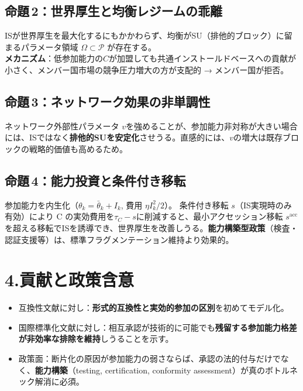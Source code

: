 \documentclass[a4paper,10pt]{article}
\begin{document}
\subsection*{命題\,2：世界厚生と均衡レジームの乖離}
ISが世界厚生を最大化するにもかかわらず、均衡がSU（排他的ブロック）に留まるパラメータ領域 $\Omega \subset \mathcal{P}$ が存在する。\\
\textbf{メカニズム}：低参加能力の$C$が加盟しても共通インストールドベースへの貢献が小さく、メンバー国市場の競争圧力増大の方が支配的 → メンバー国が拒否。

\subsection*{命題\,3：ネットワーク効果の非単調性}
ネットワーク外部性パラメータ $v$を強めることが、参加能力非対称が大きい場合には、ISではなく\textbf{排他的SUを安定化}させうる。直感的には、$v$の増大は既存ブロックの戦略的価値も高めるため。

\subsection*{命題\,4：能力投資と条件付き移転}
参加能力を内生化（$\theta_k = \bar\theta_k + I_k$, 費用 $\eta I_k^2/2$）。
条件付き移転 $s$（IS実現時のみ有効）により C の実効費用を$\tau_C - s$に削減すると、最小アクセッション移転 $s^{\mathrm{acc}}$ を超える移転でISを誘導でき、世界厚生を改善しうる。\textbf{能力構築型政策}（検査・認証支援等）は、標準フラグメンテーション維持より効果的。

\section*{4.\;貢献と政策含意}
\begin{itemize}[leftmargin=1.2em, itemsep=1pt, topsep=0pt]
  \item 互換性文献に対し：\textbf{形式的互換性と実効的参加の区別}を初めてモデル化。
  \item 国際標準化文献に対し：相互承認が技術的に可能でも\textbf{残留する参加能力格差が非効率な排除を維持}しうることを示す。
  \item 政策面：断片化の原因が参加能力の弱さならば、承認の法的付与だけでなく、\textbf{能力構築}（testing, certification, conformity assessment）が真のボトルネック解消に必須。
\end{itemize}
\end{document}
